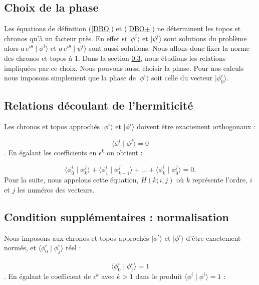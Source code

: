 \documentclass{book}
\begin{document}
\subsection{Choix de la phase}\label{choix}

Les \'equations de d\'efinition (\ref{DBO}) et (\ref{DBO+}) ne
d\'eterminent 
les topos et chronos qu'\`a un facteur pr\`es. En effet si $\mid
\phi^{i}\rangle $ et 
$\mid \psi^{i}\rangle $ sont solutions du probl\`eme alors
$a\,e^{i\theta}\mid \phi^{i}\rangle $ et $a\,e^{i\theta}\mid
\psi^{i}\rangle $ sont aussi 
solutions. Nous allons donc fixer la norme des chronos et topos \`a $1$.
Dans la section \ref{secnor}, nous \'etudions les relations
impliqu\'ees par 
ce choix.
Nous pouvons aussi choisir la phase. Pour nos calculs nous imposons
simplement que la phase de $\mid \phi^{i}\rangle $ soit celle du vecteur
$\mid \phi^{i}_0\rangle $.


\subsection{Relations d\'ecoulant de l'hermiticit\'e
 }

Les chronos et topos approch\'es $\mid \phi^{i}\rangle $ et $\mid
\phi^{i}\rangle $ doivent 
\^etre exactement orthogonaux :

\begin{equation} \langle \phi^{i}\mid \phi^{j}\rangle =0 \end{equation}.
En \'egalant les coefficients en $\epsilon^k$ on obtient :

\begin{equation}
\langle \phi^{i}_{0}\mid \phi^{j}_{k}\rangle +\langle \phi^{i}_{1}\mid
\phi^{j}_{k-1}\rangle +\ldots+\langle \phi^{i}_{k}\mid
\phi^{j}_{0}\rangle =0. 
\end{equation}
%
Pour la suite, nous appelons cette \'equation, $H(k;i,j)$ o\`u $k$
repr\'esente 
l'ordre, $i$ et $j$ les num\'eros des vecteurs.

\subsection{Condition suppl\'ementaires : normalisation}\label{secnor}


Nous imposons aux chronos et topos approch\'es $\mid \phi^{i}\rangle $ et
$\mid \phi^{i}\rangle $ d'\^etre exactement norm\'es, et
$\langle \phi^{i}_{0}\mid \phi^{i}_{j}\rangle $ r\'eel :


\begin{equation} \langle \phi^{i}_{0}\mid \phi^{i}_{1}\rangle =1 \end{equation}.
En \'egalant le coefficient de $\epsilon^k$ avec $k > 1$ dans le produit
$\langle \phi^{i}\mid \phi^{i}\rangle =1 $ :
\end{document}
